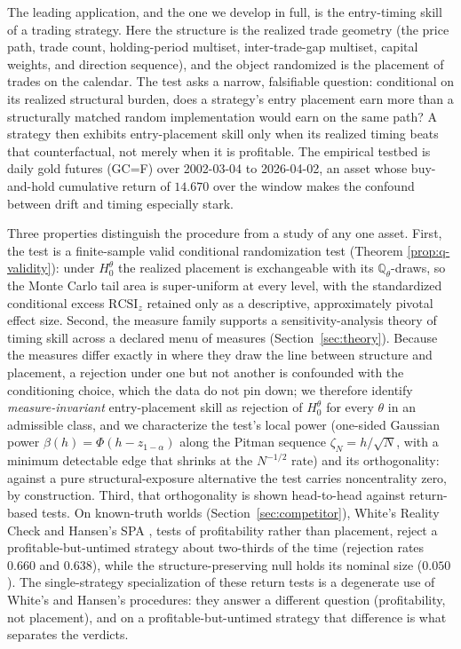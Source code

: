 \documentclass[preprint,12pt]{elsarticle}
\theoremstyle{definition}
\begin{document}
The leading application, and the one we develop in full, is the entry-timing skill of a
trading strategy. Here the structure is the realized trade geometry (the price path,
trade count, holding-period multiset, inter-trade-gap multiset, capital weights, and
direction sequence), and the object randomized is the placement of trades on the
calendar. The test asks a narrow, falsifiable question: conditional on its realized
structural burden, does a strategy's entry placement earn more than a structurally
matched random implementation would earn on the same path? A strategy then exhibits
entry-placement skill only when its realized timing beats that counterfactual, not
merely when it is profitable. The empirical testbed is daily gold futures (GC=F) over
2002-03-04 to 2026-04-02, an asset whose buy-and-hold cumulative return of $14.670$ over
the window makes the confound between drift and timing especially stark.

Three properties distinguish the procedure from a study of any one asset. First,
the test is a finite-sample valid conditional randomization test (Theorem
\ref{prop:q-validity}): under $H_0^\theta$ the realized placement is exchangeable with
its $\mathbb{Q}_\theta$-draws, so the Monte Carlo tail area is super-uniform at every
level, with the standardized conditional excess $\mathrm{RCSI}_z$ retained only as a
descriptive, approximately pivotal effect size. Second, the measure family supports a
sensitivity-analysis theory of timing skill across a declared menu of measures
(Section~\ref{sec:theory}). Because the
measures differ exactly in where they draw the line between structure and placement, a
rejection under one but not another is confounded with the conditioning choice, which
the data do not pin down; we therefore identify \emph{measure-invariant} entry-placement
skill as rejection of $H_0^\theta$ for every $\theta$ in an admissible class, and we
characterize the test's local power (one-sided Gaussian power
$\beta(h)=\Phi(h-z_{1-\alpha})$ along the Pitman sequence $\zeta_N=h/\sqrt N$, with a
minimum detectable edge that shrinks at the $N^{-1/2}$ rate) and its orthogonality:
against a pure structural-exposure alternative the test carries noncentrality zero, by
construction. Third, that orthogonality is shown head-to-head against return-based
tests. On known-truth worlds (Section~\ref{sec:competitor}), White's Reality Check
\cite{white2000} and Hansen's SPA \cite{hansen2005}, tests of profitability rather than
placement, reject a profitable-but-untimed strategy about two-thirds of the time
(rejection rates $0.660$ and $0.638$), while the structure-preserving null holds its
nominal size ($0.050$). The single-strategy specialization of these return tests is a
degenerate use of White's and Hansen's procedures: they answer a different question
(profitability, not placement), and on a profitable-but-untimed strategy that
difference is what separates the verdicts.
\end{document}
